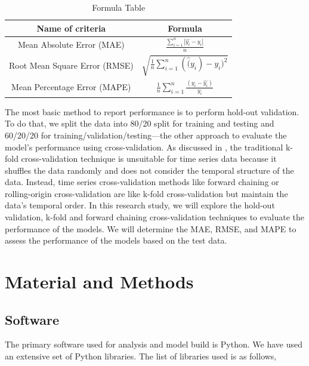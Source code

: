 \documentclass[mstat,12pt]{unswthesis}
\begin{document}
\begin{table}[h]
\centering
\caption{Formula Table}
\begin{tabular}{|c|c|}
\hline
\textbf{Name of criteria} & \textbf{Formula} \\ 
\hline
Mean Absolute Error (MAE) & $\frac{\sum_{i=1}^n|\hat{y_i}-y_i|}{n}$ \\ 
\hline
Root Mean Square Error (RMSE) & $\sqrt{\frac{1}{n}\sum_{i=1}^{n}(\hat(y_i) - y_i)^2}$ \\ 
\hline
Mean Percentage Error (MAPE) & $\frac{1}{n}\sum_{i=1}^{n}\frac{(y_i-\hat{y_i})}{y_i}$ \\ 
\hline
\end{tabular}
\end{table}

The most basic method to report performance is to perform hold-out
validation. To do that, we split the data into 80/20 split for training
and testing and 60/20/20 for training/validation/testing---the other
approach to evaluate the model's performance using cross-validation. As
discussed in \cite{rafferty2023forecasting}, the traditional k-fold
cross-validation technique is unsuitable for time series data because it
shuffles the data randomly and does not consider the temporal structure
of the data. Instead, time series cross-validation methods like forward
chaining or rolling-origin cross-validation are like k-fold
cross-validation but maintain the data's temporal order. In this
research study, we will explore the hold-out validation, k-fold and
forward chaining cross-validation techniques to evaluate the performance
of the models. We will determine the MAE, RMSE, and MAPE to assess the
performance of the models based on the test data.

\chapter{Material and Methods}\label{material-and-methods}

\section{Software}\label{software}

The primary software used for analysis and model build is Python. We
have used an extensive set of Python libraries. The list of libraries
used is as follows,
\end{document}
